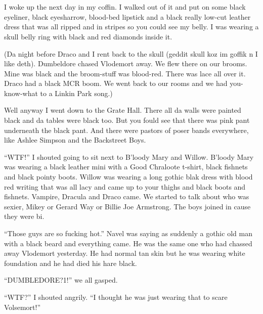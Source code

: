 \section{\chaptername~\thesection}



I woke up the next day in my coffin. I walked out of it and put on some black eyeliner, black eyesharrow, blood-bed lipstick and a black really low-cut leather dress that was all ripped and in stripes so you could see my belly. I was wearing a skull belly ring with black and red diamonds inside it.

(Da night before Draco and I rent back to the skull (geddit skull koz im goffik n I like deth). Dumbeldore chased Vlodemort away. We flew there on our brooms. Mine was black and the broom-stuff was blood-red. There was lace all over it. Draco had a black MCR boom. We went back to our rooms and we had you-know-what to a Linkin Park song.)

Well anyway I went down to the Grate Hall. There all da walls were painted black and da tables were black too. But you fould see that there was pink pant underneath the black pant. And there were pastors of poser bands everywhere, like Ashlee Simpson and the Backstreet Boys.

\enquote{WTF\@!} I shouted going to sit next to B'loody Mary and Willow. B'loody Mary was wearing a black leather mini with a Good Chraloote t-shirt, black fishnets and black pointy boots. Willow was wearing a long gothic blak dress with blood red writing that was all lacy and came up to your thighs and black boots and fishnets. Vampire, Dracula and Draco came. We started to talk about who was sexier, Mikey or Gerard Way or Billie Joe Armstrong. The boys joined in cause they were bi.

\enquote{Those guys are so fucking hot.} Navel was saying as suddenly a gothic old man with a black beard and everything came. He was the same one who had chassed away Vlodemort yesterday. He had normal tan skin but he was wearing white foundation and he had died his hare black.

\enquote{\dotfill DUMBLEDORE\@?1\@!} we all gasped.

\enquote{WTF\@?} I shouted angrily. \enquote{I thought he was just wearing that to scare Volsemort!}

